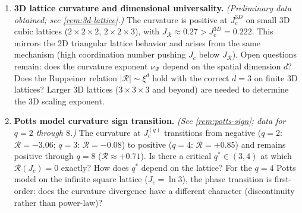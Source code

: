 \documentclass[11pt]{article}
\theoremstyle{definition}
\theoremstyle{remark}
\newcommand{\Scal}{\mathcal{R}}
\begin{document}
\begin{enumerate}
  A sharply contrasting result holds for \emph{periodic} boundary conditions
  (tori). Exact transfer-matrix data for 2D Ising tori $L = 3, \ldots, 8$
  show $|\Scal(J_c)| \sim m^{d_R^{\mathrm{PBC}}}$ with
  $d_R^{\mathrm{PBC}} \to 10/9 = 1.111\ldots$ (measured $1.1110$ at $L = 7{\to}8$),
  consistent with the conjecture $d_R^{\mathrm{PBC}} = (d\nu + 2\eta)/(d\nu + \eta)$
  (\cref{conj:pbc-scaling}). This PBC exponent is much smaller than
  the open-BC exponent, reflecting the elimination of boundary effects on the torus.

  Three open directions: (i)~extend the open-BC computation to larger grids
  ($5 \times 5$ and beyond) and non-square lattices (triangular, hexagonal)
  to confirm the exponent; (ii)~derive $\nu_{\Scal}$ analytically from
  2D Ising critical exponents; (iii)~confirm PBC predictions for
  $q = 3, 4$ Potts models as exact TM computations complete
  (\cref{subsec:pbc-scaling}).
  The $R(J)$ profile of the $4 \times 4$ grid (open BC) shows curvature sign
  change at $J_{\Scal} \approx 0.32 < J_c$, with $\Scal$ growing to $-1512$ at
  $J = 1.0$: the post-critical curvature grows as approximately
  $|J - J_c|^{-\gamma}$.

\item \textbf{3D lattice curvature and dimensional universality.}
  \emph{(Preliminary data obtained; see \cref{rem:3d-lattice}.)}
  The curvature is positive at $J_c^{3D}$ on small 3D cubic lattices
  ($2{\times}2{\times}2$, $2{\times}2{\times}3$), with $J_{\Scal} \approx
  0.27 > J_c^{3D} = 0.222$. This mirrors the 2D triangular lattice
  behavior and arises from the same mechanism (high coordination number
  pushing $J_c$ below $J_{\Scal}$). Open questions remain:
  does the curvature exponent $\nu_{\Scal}$ depend on the spatial
  dimension $d$? Does the Ruppeiner relation $|\Scal| \sim \xi^d$
  hold with the correct $d = 3$ on finite 3D lattices? Larger 3D
  lattices ($3{\times}3{\times}3$ and beyond) are needed to determine
  the 3D scaling exponent.

\item \textbf{Potts model curvature sign transition.}
  \emph{(See \cref{rem:potts-sign}; data for $q = 2$ through $8$.)}
  The curvature at $J_c^{(q)}$ transitions from negative
  ($q = 2$: $\Scal = -3.06$; $q = 3$: $\Scal = -0.08$) to positive
  ($q = 4$: $\Scal = +0.85$) and remains positive through $q = 8$
  ($\Scal \approx +0.71$). Is there a critical $q^* \in (3, 4)$ at
  which $\Scal(J_c) = 0$ exactly? How does $q^*$ depend on the
  lattice? For the $q = 4$ Potts model on the infinite square lattice
  ($J_c = \ln 3$), the phase transition is first-order: does the
  curvature divergence have a different
  character (discontinuity rather than power-law)?
\end{enumerate}
\end{document}
